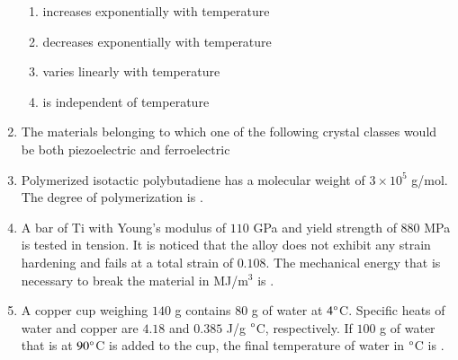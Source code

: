 \documentclass[a4paper,10pt]{article}
\begin{document}
\begin{enumerate}
    \hfill{}
    \begin{enumerate}
        \item increases exponentially with temperature
        \item decreases exponentially with temperature
        \item varies linearly with temperature
        \item is independent of temperature
    \end{enumerate}
    
    \item The materials belonging to which one of the following crystal classes would be both piezoelectric and ferroelectric
    
    \hfill{}
    \begin{enumerate}
    \end{enumerate}
    
    \item Polymerized isotactic polybutadiene has a molecular weight of $3 \times 10^5$ g/mol. The degree of polymerization is \underline{\hspace{2cm}}.
    
    \hfill{}
    
    \item A bar of Ti with Young's modulus of $110$ GPa and yield strength of $880$ MPa is tested in tension. It is noticed that the alloy does not exhibit any strain hardening and fails at a total strain of $0.108$. The mechanical energy that is necessary to break the material in MJ/m$^3$ is \underline{\hspace{2cm}}.
    
    \hfill{}
    
    \item A copper cup weighing $140$ g contains $80$ g of water at $4 \degree$C. Specific heats of water and copper are $4.18$ and $0.385$ J/g $\degree$C, respectively. If $100$ g of water that is at $90 \degree$C is added to the cup, the final temperature of water in $\degree$C is \underline{\hspace{2cm}}.
    

\end{enumerate}
\end{document}
